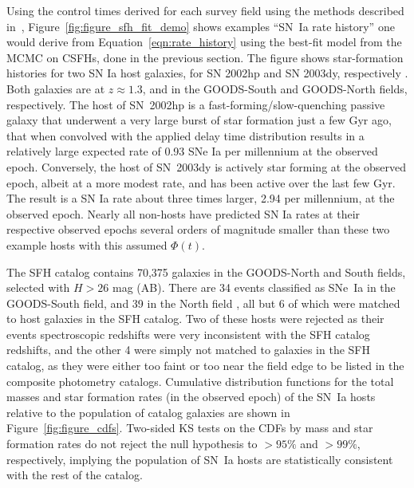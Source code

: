 \documentclass[apj]{aastex62}
\begin{document}
Using the control times derived for each survey field using the methods described in~\cite{Strolger:2015aa}, Figure~\ref{fig:figure_sfh_fit_demo} shows examples ``SN~Ia rate history'' one would derive from Equation~\ref{eqn:rate_history} using the best-fit model from the MCMC on CSFHs, done in the previous section. The figure shows star-formation histories for two SN Ia host galaxies, for SN 2002hp and SN 2003dy, respectively \cite[see][ for further details on these events]{Strolger:2004}. Both galaxies are at $z\approx 1.3$, and in the GOODS-South and GOODS-North fields, respectively. The host of SN~2002hp is a fast-forming/slow-quenching passive galaxy that underwent a very large burst of star formation just a few Gyr ago, that when convolved with the applied delay time distribution results in a relatively large expected rate of 0.93 SNe Ia per millennium at the observed epoch.  Conversely, the host of SN~2003dy is actively star forming at the observed epoch, albeit at a more modest rate, and has been active over the last few Gyr. The result is a SN Ia rate about three times larger, 2.94 per millennium, at the observed epoch. Nearly all non-hosts have predicted SN Ia rates at their respective observed epochs several orders of magnitude smaller than these two example hosts with this assumed $\Phi(t)$.
  
  
The SFH catalog contains 70,375 galaxies in the GOODS-North and South fields, selected with $H>26$ mag (AB). There are 34 events classified as SNe~Ia in the GOODS-South field, and 39 in the North field \citep{Strolger:2004, Dahlen:2008, Rodney:2014fj}, all but 6 of which were matched to host galaxies in the SFH catalog. Two of these hosts were rejected as their events spectroscopic redshifts were very inconsistent with the SFH catalog redshifts, and the other 4 were simply not matched to galaxies in the SFH catalog, as they were either too faint or too near the field edge to be listed in the composite photometry catalogs. Cumulative distribution functions for the total masses and star formation rates (in the observed epoch) of the SN~Ia hosts relative to the population of catalog galaxies are shown in Figure~\ref{fig:figure_cdfs}.  Two-sided KS tests on the CDFs by mass and star formation rates do not reject the null hypothesis to $>95\%$ and $>99\%$, respectively, implying the population of SN~Ia hosts are statistically consistent with the rest of the catalog.
\end{document}
